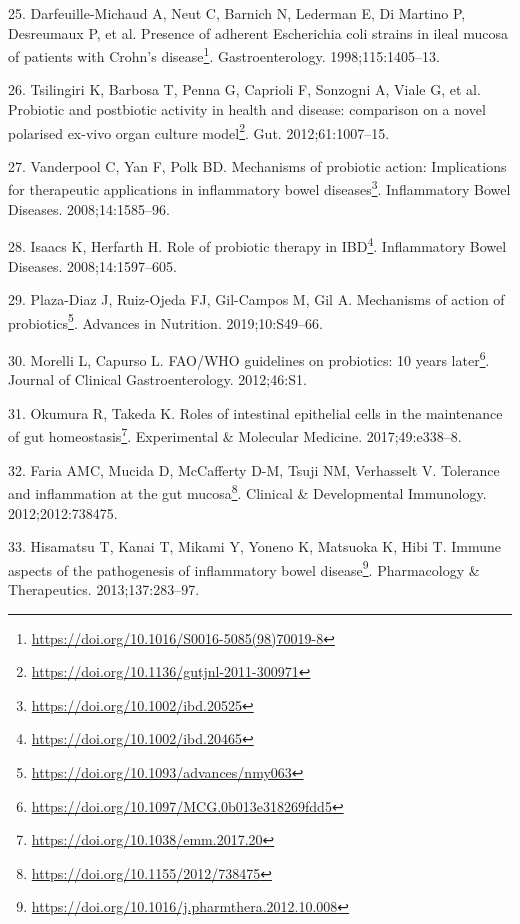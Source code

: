 \documentclass[
  a4paper,
]{book}
\DeclareRobustCommand{\href}[2]{#2\footnote{\url{#1}}}
\newlength{\cslhangindent}
\newlength{\cslentryspacingunit} %
\newenvironment{CSLReferences}[2] %
 {%
  \setlength{\parindent}{0pt}
  \ifodd #1
  \let\oldpar\par
  \def\par{\hangindent=\cslhangindent\oldpar}
  \fi
  \setlength{\parskip}{#2\cslentryspacingunit}
 }%
 {}
\begin{document}
\begin{CSLReferences}{0}{0}
\leavevmode{}%
25. Darfeuille-Michaud A, Neut C, Barnich N, Lederman E, Di Martino P, Desreumaux P, et al. \href{https://doi.org/10.1016/S0016-5085(98)70019-8}{Presence of adherent Escherichia coli strains in ileal mucosa of patients with Crohn's disease}. Gastroenterology. 1998;115:1405--13.

\leavevmode{}%
26. Tsilingiri K, Barbosa T, Penna G, Caprioli F, Sonzogni A, Viale G, et al. \href{https://doi.org/10.1136/gutjnl-2011-300971}{Probiotic and postbiotic activity in health and disease: comparison on a novel polarised ex-vivo organ culture model}. Gut. 2012;61:1007--15.

\leavevmode{}%
27. Vanderpool C, Yan F, Polk BD. \href{https://doi.org/10.1002/ibd.20525}{Mechanisms of probiotic action: Implications for therapeutic applications in inflammatory bowel diseases}. Inflammatory Bowel Diseases. 2008;14:1585--96.

\leavevmode{}%
28. Isaacs K, Herfarth H. \href{https://doi.org/10.1002/ibd.20465}{Role of probiotic therapy in IBD}. Inflammatory Bowel Diseases. 2008;14:1597--605.

\leavevmode{}%
29. Plaza-Diaz J, Ruiz-Ojeda FJ, Gil-Campos M, Gil A. \href{https://doi.org/10.1093/advances/nmy063}{Mechanisms of action of probiotics}. Advances in Nutrition. 2019;10:S49--66.

\leavevmode{}%
30. Morelli L, Capurso L. \href{https://doi.org/10.1097/MCG.0b013e318269fdd5}{FAO/WHO guidelines on probiotics: 10 years later}. Journal of Clinical Gastroenterology. 2012;46:S1.

\leavevmode{}%
31. Okumura R, Takeda K. \href{https://doi.org/10.1038/emm.2017.20}{Roles of intestinal epithelial cells in the maintenance of gut homeostasis}. Experimental \& Molecular Medicine. 2017;49:e338--8.

\leavevmode{}%
32. Faria AMC, Mucida D, McCafferty D-M, Tsuji NM, Verhasselt V. \href{https://doi.org/10.1155/2012/738475}{Tolerance and inflammation at the gut mucosa}. Clinical \& Developmental Immunology. 2012;2012:738475.

\leavevmode{}%
33. Hisamatsu T, Kanai T, Mikami Y, Yoneno K, Matsuoka K, Hibi T. \href{https://doi.org/10.1016/j.pharmthera.2012.10.008}{Immune aspects of the pathogenesis of inflammatory bowel disease}. Pharmacology \& Therapeutics. 2013;137:283--97.


\end{CSLReferences}
\end{document}
